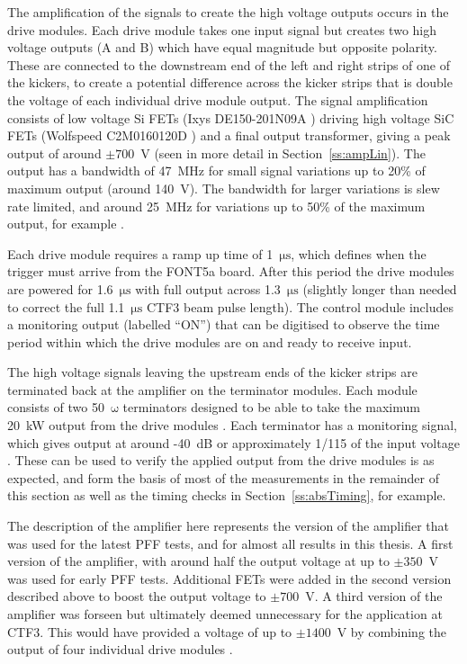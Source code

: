 The amplification of the signals to create the high voltage outputs occurs in the drive modules. Each drive module takes one input signal but creates two high voltage outputs (A and B) which have equal magnitude but opposite polarity. These are connected to the downstream end of the left and right strips of one of the kickers, to create a potential difference across the kicker strips that is double the voltage of each individual drive module output. The signal amplification consists of low voltage Si FETs (Ixys DE150-201N09A \cite{ixysFET}) driving high voltage SiC FETs (Wolfspeed C2M0160120D \cite{wolfFET}) and a final output transformer, giving a peak output of around \(\pm700\)~V (seen in more detail in Section~\ref{ss:ampLin}). The output has a bandwidth of 47~MHz for small signal variations up to 20\% of maximum output (around 140~V). The bandwidth for larger variations is slew rate limited, and around 25~MHz for variations up to 50\% of the maximum output, for example \cite{colinCLIC16}.

Each drive module requires a ramp up time of 1~\(\mathrm{\mu s}\), which defines when the trigger must arrive from the FONT5a board. After this period the drive modules are powered for 1.6~\(\mathrm{\mu s}\)  with full output across 1.3~\(\mathrm{\mu s}\) (slightly longer than needed to correct the full 1.1~\(\mathrm{\mu s}\) CTF3 beam pulse length). The control module includes a monitoring output (labelled ``ON'') that can be digitised to observe the time period within which the drive modules are on and ready to receive input.

The high voltage signals leaving the upstream ends of the kicker strips are terminated back at the amplifier on the terminator modules. Each module consists of two 50~\(\mathrm{\omega}\) terminators designed to be able to take the maximum 20~kW output from the drive modules \cite{colinCLIC16}. Each terminator has a monitoring signal, which gives output at around -40~dB or approximately 1/115 of the input voltage \cite{colinPriv}. These can be used to verify the applied output from the drive modules is as expected, and form the basis of most of the measurements in the remainder of this section as well as the timing checks in Section~\ref{ss:absTiming}, for example.

The description of the amplifier here represents the version of the amplifier that was used for the latest PFF tests, and for almost all results in this thesis. A first version of the amplifier, with around half the output voltage at up to \(\pm350\)~V was used for early PFF tests. Additional FETs were added in the second version described above to boost the output voltage to \(\pm700\)~V. A third version of the amplifier was forseen but ultimately deemed unnecessary for the application at CTF3. This would have provided a voltage of up to \(\pm1400\)~V by combining the output of four individual drive modules \cite{glennCLIC13}.


